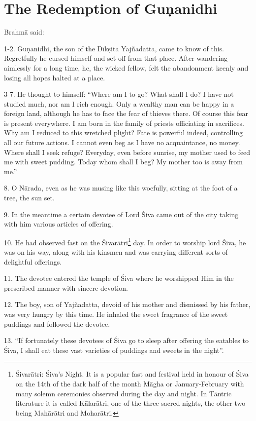 \chapter{The Redemption of Guṇanidhi}

Brahmā said:

1-2. Guṇanidhi, the son of the Dīkṣita Yajñadatta, came to know of this.
Regretfully he cursed himself and set off from that place. After wandering
aimlessly for a long time, he, the wicked fellow, felt the abandonment keenly
and losing all hopes halted at a place.

3-7. He thought to himself: “Where am I to go? What shall I do? I have not
studied much, nor am I rich enough. Only a wealthy man can be happy in a foreign
land, although he has to face the fear of thieves there. Of course this fear is
present everywhere. I am born in the family of priests officiating in sacrifices.
Why am I reduced to this wretched plight? Fate is powerful indeed, controlling
all our future actions. I cannot even beg as I have no acquaintance, no money.
Where shall I seek refuge? Everyday, even before sunrise, my mother used to feed
me with sweet pudding. Today whom shall I beg? My mother too is away from me.”

8. O Nārada, even as he was musing like this woefully, sitting at the foot of
a tree, the sun set.

9. In the meantime a certain devotee of Lord Śiva came out of the city taking
with him various articles of offering.

10. He had observed fast on the Śivarātri\footnote{Śivarātri: Śiva’s Night. It
is a popular fast and festival held in honour of Śiva on the 14th of the dark
half of the month Māgha or January-February with many solemn ceremonies observed
during the day and night. In Tāntric literature it is called Kālarātri, one of
the three sacred nights, the other two being Mahārātri and Moharātri.} day. In
order to worship lord Śiva, he was on his way, along with his kinsmen and was
carrying different sorts of delightful offerings.

11. The devotee entered the temple of Śiva where he worshipped Him in
the prescribed manner with sincere devotion.

12. The  boy, son of Yajñadatta, devoid of his mother and dismissed
by his father, was very hungry by this time. He inhaled the sweet fragrance of
the sweet puddings and followed the devotee.

13. “If fortunately these devotees of Śiva go to sleep after offering the
eatables to Śiva, I shall eat these vast varieties of puddings and sweets in
the night”.

